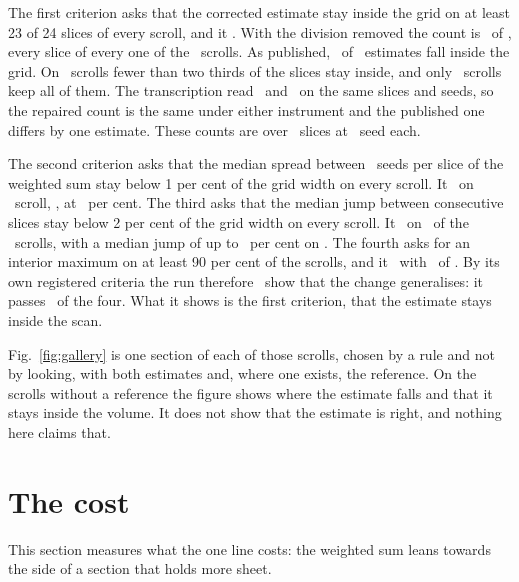 The first criterion asks that the corrected estimate stay inside the grid on at least 23 of 24
slices of every scroll, and it \RevGenCritOnePass. With the division removed the count is
\RevGenInsideFixed\ of \RevGenSlices, every slice of every one of the \RevGenAllInside\ scrolls. As
published, \RevGenInsideAsIs\ of \RevGenSlices\ estimates fall inside the grid. On
\RevGenUnderSixteen\ scrolls fewer than two thirds of the slices stay inside, and only
\RevGenAllInsideAsIs\ scrolls keep all of them. The transcription read
\RevGenInsideAsIsTranscription\ and \RevGenInsideFixedTranscription\ on the same slices and seeds,
so the repaired count is the same under either instrument and the published one differs by one
estimate. These counts are over \RevGenSlices\ slices at \RevGenSeedsPerSlice\ seed each.

The second criterion asks that the median spread between \RevGenSpreadSeeds\ seeds per slice of
the weighted sum stay below 1 per cent of the grid width on every scroll. It \RevGenCritTwoPass\ on
\RevGenCritTwoFail\ scroll, \RevGenSeedWorstScroll, at \RevGenSeedWorst\ per cent. The third asks
that the median jump between consecutive slices stay below 2 per cent of the grid width on every
scroll. It \RevGenCritThreePass\ on \RevGenCritThreeFail\ of the \RevGenScrolls\ scrolls, with a
median jump of up to \RevGenJumpWorst\ per cent on \RevGenJumpWorstScroll. The fourth asks for an
interior maximum on at least 90 per cent of the scrolls, and it \RevGenCritFourPass\ with
\RevGenInterior\ of \RevGenScrolls. By its own registered criteria the run therefore
\RevGenGeneralises\ show that the change generalises: it passes \RevGenCritPassed\ of the four. What
it shows is the first criterion, that the estimate stays inside the scan.

Fig.~\ref{fig:gallery} is one section of each of those scrolls, chosen by a rule and not by looking,
with both estimates and, where one exists, the reference. On the scrolls without a reference the
figure shows where the estimate falls and that it stays inside the volume. It does not show that
the estimate is right, and nothing here claims that.

\section{The cost}
\label{sec:density}
This section measures what the one line costs: the weighted sum leans towards the side of a
section that holds more sheet.

